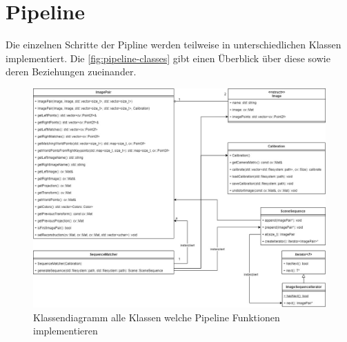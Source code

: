 \section{Pipeline}
Die einzelnen Schritte der Pipline werden teilweise in unterschiedlichen Klassen implementiert.
Die \autoref{fig:pipeline-classes} gibt einen Überblick über diese sowie deren Beziehungen zueinander.

\begin{figure}
    \centering
    \includegraphics[width=\textwidth]{src/img/classes.jpg}
    \caption{Klassendiagramm alle Klassen welche Pipeline Funktionen implementieren}
    \label{fig:pipeline-classes}
\end{figure}